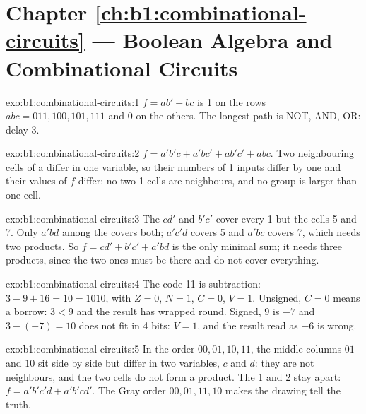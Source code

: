 \section*{Chapter \ref{ch:b1:combinational-circuits} --- Boolean Algebra and Combinational Circuits}

\begin{solution}{exo:b1:combinational-circuits:1}
$f = ab' + bc$ is 1 on the rows $abc = 011, 100, 101, 111$ and 0 on the others. The longest path is NOT, AND, OR: delay 3.
\end{solution}

\begin{solution}{exo:b1:combinational-circuits:2}
$f = a'b'c + a'bc' + ab'c' + abc$. Two neighbouring cells of a  differ in one variable, so their numbers of
1 inputs differ by one and their values of $f$ differ: no two 1 cells are neighbours, and no group is larger than one
cell.
\end{solution}

\begin{solution}{exo:b1:combinational-circuits:3}
The  $cd'$ and $b'c'$ cover every 1 but the cells 5 and 7. Only $a'bd$ among the  covers both;
$a'c'd$ covers 5 and $a'bc$ covers 7, which needs two products. So $f = cd' + b'c' + a'bd$ is the only minimal sum; it
needs three products, since the two  ones must be there and do not cover everything.
\end{solution}

\begin{solution}{exo:b1:combinational-circuits:4}
The code 11 is subtraction: $3 - 9 + 16 = 10 = 1010$, with $Z = 0$, $N = 1$, $C = 0$, $V = 1$. Unsigned, $C = 0$ means a
borrow: $3 < 9$ and the result has wrapped round. Signed, $9$ is $-7$ and $3 - (-7) = 10$ does not fit in 4 bits: $V =
1$, and the result read as $-6$ is wrong.
\end{solution}

\begin{solution}{exo:b1:combinational-circuits:5}
In the order $00, 01, 10, 11$, the middle columns $01$ and $10$ sit side by side but differ in two variables, $c$ and $d$:
they are not neighbours, and the two cells do not form a product. The  1 and 2 stay apart: $f = a'b'c'd +
a'b'cd'$. The Gray order $00, 01, 11, 10$ makes the drawing tell the truth.
\end{solution}

